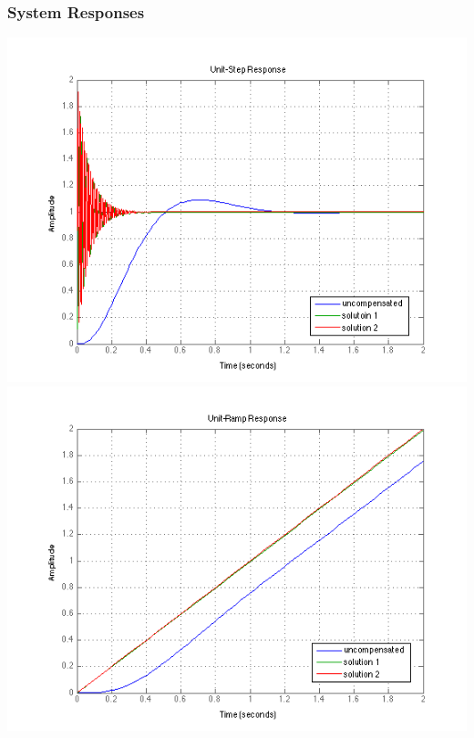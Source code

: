 \documentclass[letterpaper,10pt]{article}
\begin{document}
\subsubsection*{System Responses}
\begin{center}
	\includegraphics[scale=0.6]{3-unit-step.png} \\
	\includegraphics[scale=0.6]{3-unit-ramp.png}
\end{center}
\end{document}
